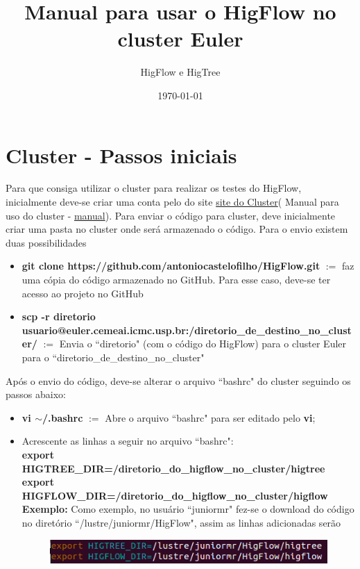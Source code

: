 \documentclass[12pt]{article}
\begin{document}
\title{Manual para usar o HigFlow no cluster Euler}
\author{HigFlow e HigTree}
\date{\today}
\maketitle

\section{Cluster - Passos iniciais}\label{sec:clu_pas_ini}

Para que consiga utilizar o cluster para realizar os testes do HigFlow, inicialmente deve-se criar uma conta pelo do site \href{http://www.cemeai.icmc.usp.br/Euler/index.html}{site do Cluster}( Manual para uso do cluster - \href{http://resources.altair.com/pbs/documentation/support/PBSProUserGuide12.2.pdf}{manual}). Para enviar o código para cluster, deve inicialmente criar uma pasta no cluster onde será armazenado o código. Para o envio existem duas possibilidades
\begin{itemize}
	\item \textbf{git clone https://github.com/antoniocastelofilho/HigFlow.git} $:=$ faz uma cópia do código armazenado no GitHub. Para esse caso, deve-se ter acesso ao projeto no GitHub
	\item \textbf{scp -r diretorio usuario@euler.cemeai.icmc.usp.br:/diretorio\_de\_destino\_no\_cluster/}	$:=$ Envia o ``diretorio" (com o código do HigFlow) para o cluster Euler para o ``diretorio\_de\_destino\_no\_cluster"
\end{itemize}
 
 Após o envio do código, deve-se alterar o arquivo ``bashrc" do cluster seguindo os passos abaixo:
 \begin{itemize}
 	\item \textbf{vi $\sim$/.bashrc} $:=$ Abre o arquivo ``bashrc" para ser editado pelo \textbf{vi};
 	\item Acrescente as linhas a seguir no arquivo ``bashrc":\\
 	\textbf{export HIGTREE\_DIR=/diretorio\_do\_higflow\_no\_cluster/higtree}\\
 	\textbf{export HIGFLOW\_DIR=/diretorio\_do\_higflow\_no\_cluster/higflow}\\
 	
 	\textbf{Exemplo:} Como exemplo, no usuário ``juniormr" fez-se o download do código no diretório ``/lustre/juniormr/HigFlow", assim as linhas adicionadas serão\\
 	\begin{figure}[htb]
 		\centering
 		\includegraphics[width=0.98\linewidth]{figures/export_bashrc}
 		\label{fig:fig01}
 	\end{figure}
 \end{itemize}
\end{document}
